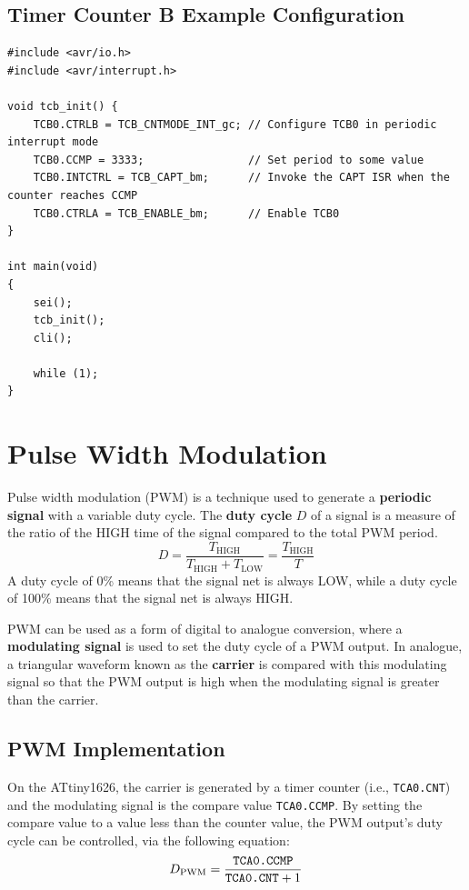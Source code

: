 \documentclass[a4paper]{report}
\begin{document}
\subsection{Timer Counter B Example Configuration}
\begin{verbatim}
#include <avr/io.h>
#include <avr/interrupt.h>

void tcb_init() {
    TCB0.CTRLB = TCB_CNTMODE_INT_gc; // Configure TCB0 in periodic interrupt mode
    TCB0.CCMP = 3333;                // Set period to some value
    TCB0.INTCTRL = TCB_CAPT_bm;      // Invoke the CAPT ISR when the counter reaches CCMP
    TCB0.CTRLA = TCB_ENABLE_bm;      // Enable TCB0
}

int main(void)
{
    sei();
    tcb_init();
    cli();

    while (1);
}
\end{verbatim}
\section{Pulse Width Modulation}
Pulse width modulation (PWM) is a technique used to generate a \textbf{periodic signal}
with a variable duty cycle. The \textbf{duty cycle} \(D\) of a signal
is a measure of the ratio of the HIGH time of the signal compared to the total PWM period.
\begin{equation*}
    D = \frac{T_\mathrm{HIGH}}{T_\mathrm{HIGH} + T_\mathrm{LOW}} = \frac{T_\mathrm{HIGH}}{T}
\end{equation*}
A duty cycle of 0\% means that the signal net is always LOW, while a duty cycle of 100\%
means that the signal net is always HIGH\@.

PWM can be used as a form of digital to analogue conversion, where a \textbf{modulating signal}
is used to set the duty cycle of a PWM output. In analogue, a triangular waveform known as the \textbf{carrier}
is compared with this modulating signal so that the PWM output is high when the modulating signal is greater than the carrier.
\subsection{PWM Implementation}
On the ATtiny1626, the carrier is generated by a timer counter (i.e., \texttt{TCA0.CNT}) and the modulating signal
is the compare value \texttt{TCA0.CCMP}. By setting the compare value to a value less than the counter value,
the PWM output's duty cycle can be controlled, via the following equation:
\begin{equation*}
    D_\mathrm{PWM} = \frac{\text{\texttt{TCA0.CCMP}}}{\text{\texttt{TCA0.CNT}} + 1}
\end{equation*}
\end{document}
